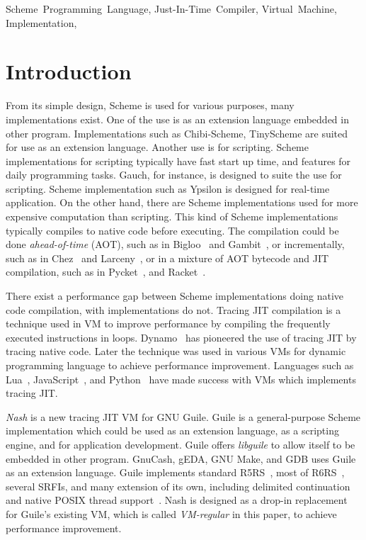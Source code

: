 \documentclass[preprint, 10pt]{sigplanconf}
\begin{document}
\keywords{} Scheme~Programming~Language, Just-In-Time~Compiler, Virtual~Machine,
Implementation,

\section{Introduction}

From its simple design, Scheme is used for various purposes, many
implementations exist. One of the use is as an extension language embedded in
other program. Implementations such as Chibi-Scheme, TinyScheme are suited for
use as an extension language. Another use is for scripting. Scheme
implementations for scripting typically have fast start up time, and features
for daily programming tasks. Gauch, for instance, is designed to suite the use
for scripting. Scheme implementation such as Ypsilon is designed for real-time
application. On the other hand, there are Scheme implementations used for more
expensive computation than scripting. This kind of Scheme implementations
typically compiles to native code before executing. The compilation could be
done \textit{ahead-of-time} (AOT), such as in Bigloo~\cite{serrano1995bigloo}
and Gambit~\cite{feeley1998gambit}, or incrementally, such as in
Chez~\cite{dybvig2006development} and Larceny~\cite{hansen1992impact}, or in a
mixture of AOT bytecode and JIT compilation, such as in
Pycket~\cite{bauman2015pycket}, and Racket~\cite{flatt2013racket}.

There exist a performance gap between Scheme implementations doing native code
compilation, with implementations do not. Tracing JIT compilation is a
technique used in VM to improve performance by compiling the frequently
executed instructions in loops. Dynamo~\cite{bala2000dynamo} has pioneered the
use of tracing JIT by tracing native code. Later the technique was used in
various VMs for dynamic programming language to achieve performance
improvement. Languages such as Lua~\cite{pall2016luajit},
JavaScript~\cite{gal2009trace}, and Python~\cite{bolz2009tracing} have made
success with VMs which implements tracing JIT.\@

\textit{Nash} is a new tracing JIT VM for GNU Guile. Guile is a
general-purpose Scheme implementation which could be used as an extension
language, as a scripting engine, and for application development. Guile offers
\textit{libguile} to allow itself to be embedded in other program. GnuCash,
gEDA, GNU Make, and GDB uses Guile as an extension language. Guile implements
standard R5RS~\cite{abelson1998revised5}, most of
R6RS~\cite{sperber2010revised}, several SRFIs, and many extension of its own,
including delimited continuation and native POSIX thread
support~\cite{Galassi02guilereference}. Nash is designed as a drop-in
replacement for Guile's existing VM, which is called \textit{VM-regular} in
this paper, to achieve performance improvement.
\end{document}
